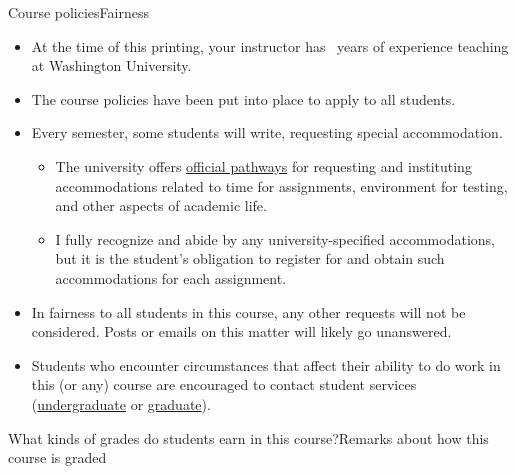 \begin{frame}{Course policies}{Fairness}
\Vskip{-3.5em}\begin{itemize}
    \item At the time of this printing, your instructor has \number\numexpr{}\relax~years of experience teaching at Washington University.
    \item The course policies have been put into place to apply to all students.
    \item Every semester, some students will write, requesting special accommodation.  
    \begin{itemize}
        \item 
    The university offers \href{https://students.wustl.edu/disability-resources/}{official pathways} for requesting and instituting accommodations related to time for assignments, environment for testing, and other aspects of academic life.
    \item I fully recognize and abide by any university-specified accommodations, but it is the \alert{student's obligation} to register for and obtain such accommodations \alert{for each assignment}.
    \end{itemize}
    \item In fairness to all students in this course, any other requests will not be considered.  Posts or emails on this matter will likely go unanswered.
    \item Students who encounter circumstances that affect their ability to do work in this (or any) course are encouraged to contact student services (\href{https://engineering.wustl.edu/offices-services/student-services/undergraduate-student-services/index.html}{undergraduate} or \href{https://engineering.wustl.edu/offices-services/student-services/graduate-student-services/}{graduate}).
\end{itemize}
    
\end{frame}

\begin{frame}{What kinds of grades do students earn in this course?}{Remarks about how this course is graded}
    
\end{frame}

